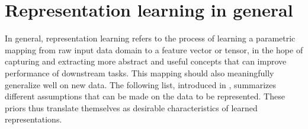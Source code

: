\section{Representation learning in general}
\label{sec-repr-models-general}
In general, representation learning refers to the process of learning 
a parametric mapping from raw input data domain
to a feature vector or tensor, in the hope of capturing and extracting more abstract and useful concepts
that can improve performance of downstream tasks.
This mapping should also meaningfully generalize well on new data.
The following list, introduced in \cite{bengio2013representation},
summarizes different assumptions that can be made on the data to be represented.
These priors thus translate themselves as
desirable characteristics of learned representations.
